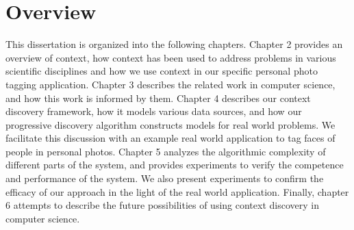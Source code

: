 \section{Overview}
This dissertation is organized into the following chapters. Chapter 2 provides an overview of context, how context has been used to address problems in various scientific disciplines and how we use context in our specific personal photo tagging application. Chapter 3 describes the related work in computer science, and how this work is informed by them. Chapter 4 describes our context discovery framework, how it models various data sources, and how our progressive discovery algorithm constructs models for real world problems. We facilitate this discussion with an example real world application to tag faces of people in personal photos. Chapter 5 analyzes the algorithmic complexity of different parts of the system, and provides experiments to verify the competence and performance of the system. We also present experiments to confirm the efficacy of our approach in the light of the real world application. Finally, chapter 6 attempts to describe the future possibilities of using context discovery in computer science.



